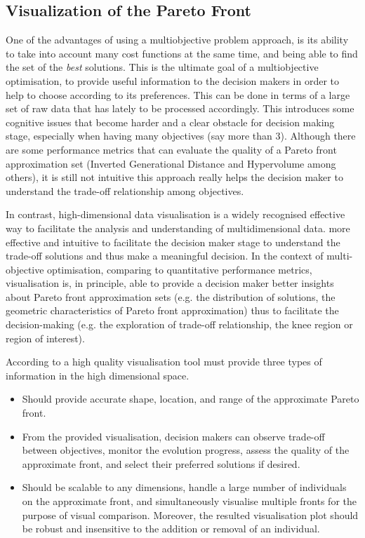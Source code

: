 \subsection{Visualization of the Pareto Front}
\label{sec:ParetoVisualization}
%
One of the advantages of using a multiobjective problem approach, is its ability to take into account many cost functions at the same time, and being able to find the set of the \emph{best} solutions. This is the ultimate goal of a multiobjective optimisation, to provide useful information to the decision makers in order to help to choose according to its preferences. This can be done in terms of a large set of raw data that has lately to be processed accordingly. This introduces some cognitive issues that become harder and a clear obstacle for decision making stage, especially when having many objectives (say more than 3). Although there are some performance metrics that can evaluate the quality of a Pareto front approximation set (Inverted Generational Distance \citep{Bosman2003} and Hypervolume \citep{Zitzler1999} among others), it is still not intuitive this approach really helps the decision maker to understand the trade-off relationship among objectives.

In contrast, high-dimensional data visualisation is a widely recognised effective way to facilitate the analysis and understanding of multidimensional data. more effective and intuitive to facilitate the decision maker stage to understand the trade-off solutions and thus make a meaningful decision. In the context of multi-objective optimisation, comparing to quantitative performance metrics, visualisation is, in principle, able to provide a decision maker better insights about Pareto front approximation sets (e.g. the distribution of solutions, the geometric characteristics of Pareto front approximation) thus to facilitate the decision-making (e.g. the exploration of trade-off relationship, the knee region or region of interest).

According to \citet{Gao2019} a high quality visualisation tool must provide three types of information in the high dimensional space. 
\begin{itemize}
\item  Should provide accurate shape, location, and range of the approximate Pareto front. 
\item  From the provided visualisation, decision makers can observe trade-off between objectives, monitor the evolution progress, assess the quality of the approximate front, and select their preferred solutions if desired. 
\item  Should be scalable to any dimensions, handle a large number of individuals on the approximate front, and simultaneously visualise multiple fronts for the purpose of visual comparison. Moreover, the resulted visualisation plot should be robust and insensitive to the addition or removal of an individual.
\end{itemize}


